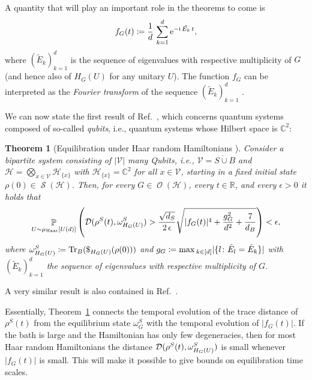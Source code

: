 \documentclass[a4paper,12pt,listof=totoc,index=totoc,bibliography=totoc,headsepline=false,headings=normal,BCOR16.153846mm,DIV12,headinclude,twoside,cleardoublepage=empty,numbers=noenddot,final]{scrreprt}
\theoremstyle{mystyle}
\numberwithin{equation}{section}
\numberwithin{figure}{section}
\numberwithin{lemma}{section}
\newtheorem{theorem}{Theorem}
\numberwithin{theorem}{section}
\numberwithin{corollary}{section}
\numberwithin{definition}{section}
\numberwithin{conjecture}{section}
\numberwithin{observation}{section}
\newcommand{\+}{\mkern2mu}
\newcommand{\coloneqq}{\mathrel{\vcentcolon\mkern-1.2mu=}} %
\newcommand{\dunion}{\mathbin{\dot{\cup}}}
\newcommand{\oftype}{\colon}
\renewcommand{\max}{\mathchoice{\operatorname*{max}}{\operatorname*{max}}{\mathrm{max}}{\mathrm{max}}} %
\renewcommand{\H}{H}
\newcommand{\muhaar}{\mu_{\mathrm{Haar}}}
\newcommand{\Vset}{\mathcal{V}}
\newcommand{\tracedistance}[3][]{
  \ifthenelse{\equal{#2}{}}
  {\ifthenelse{\equal{#3}{}}
    {\mathcal{D}_{#1}}{}
  }{
    \ifthenelse{\equal{#1}{}}
    {\operatorname{\mathcal{D}}(#2,#3)}
    {\operatorname{\mathcal{D}}_{#1}(#2,#3)}
  }
}
\DeclareMathOperator*{\probability}{\mathbb{P}}
\newcommand{\e}{\mathrm{e}}
\renewcommand{\i}{\mathrm{i}}
\DeclareMathOperator{\1}{\mathds{1}}
\DeclareMathOperator{\Obs}{\mathcal{O}}
\DeclareMathOperator{\Qst}{\mathcal{S}}
\DeclareMathOperator{\Tr}{Tr}
\newcommand{\mc}[1]{\mathcal{#1}}
\newcommand{\mcH}{\mc{H}}
\newcommand{\mb}[1]{\mathbb{#1}}
\newcommand{\R}{\mb{R}}
\renewcommand{\C}{\mb{C}} %
\begin{document}
A quantity that will play an important role in the theorems to come is
\begin{equation} \label{eq:deffouriertransformedcpectrum}
  f_G(t) \coloneqq \frac{1}{d}\,\sum_{k=1}^d \e^{- \i\,\tilde{E_k}\,t} ,
\end{equation}
where $(\tilde E_k)_{k=1}^d$ is the sequence of eigenvalues with respective multiplicity of $G$ (and hence also of $\H_G(U)$ for any unitary $U$).
The function $f_G$ can be interpreted as the \emph{Fourier transform} of the sequence $(\tilde E_k)_{k=1}^d$ \cite{1108.0374}.

We can now state the first result of Ref.~\cite{1108.0374}, which concerns quantum systems composed of so-called \emph{qubits}, i.e., quantum systems whose Hilbert space is $\C^2$:
\begin{theorem}[Equilibration under Haar random Hamiltonians {\cite[Result~1]{1108.0374}}] \label{thm:equilibrationunderrandomhamiltonians}
  Consider a bipartite system consisting of $|\Vset|$ many Qubits, i.e., $\Vset = S \dunion B$ and $\mcH = \bigotimes_{x\in\Vset} \mcH_{\{x\}}$ with $\mcH_{\{x\}} = \C^2$ for all $x \in \Vset$, starting in a fixed initial state $\rho(0) \in \Qst(\mcH)$.
  Then, for every $G \in \Obs(\mcH)$, every $t \in \R$, and every $\epsilon > 0$ it holds that
  \begin{equation} \label{eq:equilibrationunderrandomhamiltonsbound}
    \probability_{U \sim \muhaar[U(d)]}\left( \tracedistance{\rho^S(t)}{\omega_{H_G(U)}^S} > \frac{\sqrt{d_S}}{2\,\epsilon} \sqrt{ |f_G(t)|^4 + \frac{g_G^2}{d^2} + \frac{7}{d_B} }\right) < \epsilon ,
  \end{equation}
  where $\omega_{H_G(U)}^S \coloneqq \Tr_B(\$_{\H_G(U)}(\rho(0)))$ and $g_G \coloneqq \max_{k\in[d]} |\{l\oftype \tilde E_l = \tilde E_k \}|$ with $(\tilde E_k)_{k=1}^d$ the sequence of eigenvalues with respective multiplicity of $G$.
\end{theorem}
A very similar result is also contained in Ref.~\cite{1108.2985v3}.

Essentially, Theorem~\ref{thm:equilibrationunderrandomhamiltonians} connects the temporal evolution of the trace distance of $\rho^S(t)$ from the equilibrium state $\omega^S_G$ with the temporal evolution of $|f_G(t)|$.
If the bath is large and the Hamiltonian has only few degeneracies, then for most Haar random Hamiltonians the distance $\tracedistance{\rho^S(t)}{\omega_{H_G(U)}^S}$ is small whenever $|f_G(t)|$ is small.
This will make it possible to give bounds on equilibration time scales.
\end{document}
